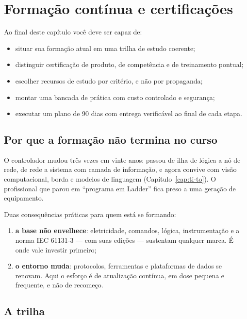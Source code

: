 \chapter{Formação contínua e certificações}
\label{cap:formacao}

\begin{objetivos}
Ao final deste capítulo você deve ser capaz de:
\begin{itemize}
  \item situar sua formação atual em uma trilha de estudo coerente;
  \item distinguir certificação de produto, de competência e de treinamento pontual;
  \item escolher recursos de estudo por critério, e não por propaganda;
  \item montar uma bancada de prática com custo controlado e segurança;
  \item executar um plano de 90 dias com entrega verificável ao final de cada etapa.
\end{itemize}
\end{objetivos}

\section{Por que a formação não termina no curso}

O controlador mudou três vezes em vinte anos: passou de ilha de lógica a nó de rede, de rede a
sistema com camada de informação, e agora convive com visão computacional, borda e modelos de
linguagem (Capítulo~\ref{cap:ti-to}). O profissional que parou em ``programa em Ladder'' fica preso a
uma geração de equipamento.

Duas consequências práticas para quem está se formando:

\begin{enumerate}
  \item \textbf{a base não envelhece}: eletricidade, comandos, lógica, instrumentação e a norma
        IEC 61131-3 --- com suas edições --- sustentam qualquer marca. É onde vale investir primeiro;
  \item \textbf{o entorno muda}: protocolos, ferramentas e plataformas de dados se renovam. Aqui o
        esforço é de atualização contínua, em dose pequena e frequente, e não de recomeço.
\end{enumerate}


\section{A trilha}

